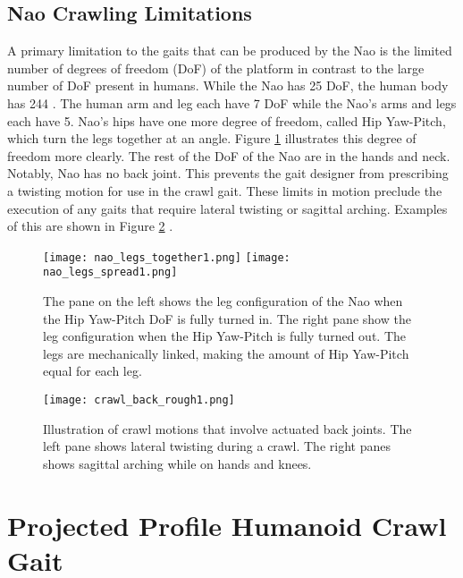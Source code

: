 \subsection{Nao Crawling Limitations}

A primary limitation to the gaits that can be produced by the Nao is the limited number of degrees of freedom (DoF) of the platform
in contrast to the large number of DoF present in humans. While the Nao has 25 DoF, the human body has 244 \cite{zatsiorskybiomechanics}.
The human arm and leg each have 7 DoF while the Nao's arms and legs each have 5. 
Nao's hips have one more degree of freedom, called Hip Yaw-Pitch, which turn the legs together at an angle. 
Figure \ref{fig:nao_hips_legs1} illustrates this degree of freedom more clearly. 
The rest of the DoF of the Nao are in the hands and neck. 
Notably, Nao has no back joint. This prevents the gait designer from prescribing a twisting motion for use in the crawl gait.
These limits in motion preclude the execution of any gaits that require lateral twisting or sagittal arching.
Examples of this are shown in Figure \ref{fig:crawl_back1} .

\begin{figure}
	\vspace*{-0.07in}
	\centerline{\texttt{[image: nao\_legs\_together1.png]}
				\texttt{[image: nao\_legs\_spread1.png]}
				}
	\caption{The pane on the left shows the leg configuration of the Nao when the Hip Yaw-Pitch DoF is fully turned in.
				The right pane show the leg configuration when the Hip Yaw-Pitch is fully turned out. 
				The legs are mechanically linked, making the amount of Hip Yaw-Pitch equal for each leg.}
	\label{fig:nao_hips_legs1}
	\vspace*{-0.2in}
\end{figure}

\begin{figure}
	\centering
	\texttt{[image: crawl\_back\_rough1.png]}
	\caption
	{Illustration of crawl motions that involve actuated back joints. The left pane shows lateral twisting during a crawl.
		The right panes shows sagittal arching while on hands and knees.}
	\label{fig:crawl_back1}
\end{figure}

\section{Projected Profile Humanoid Crawl Gait}

